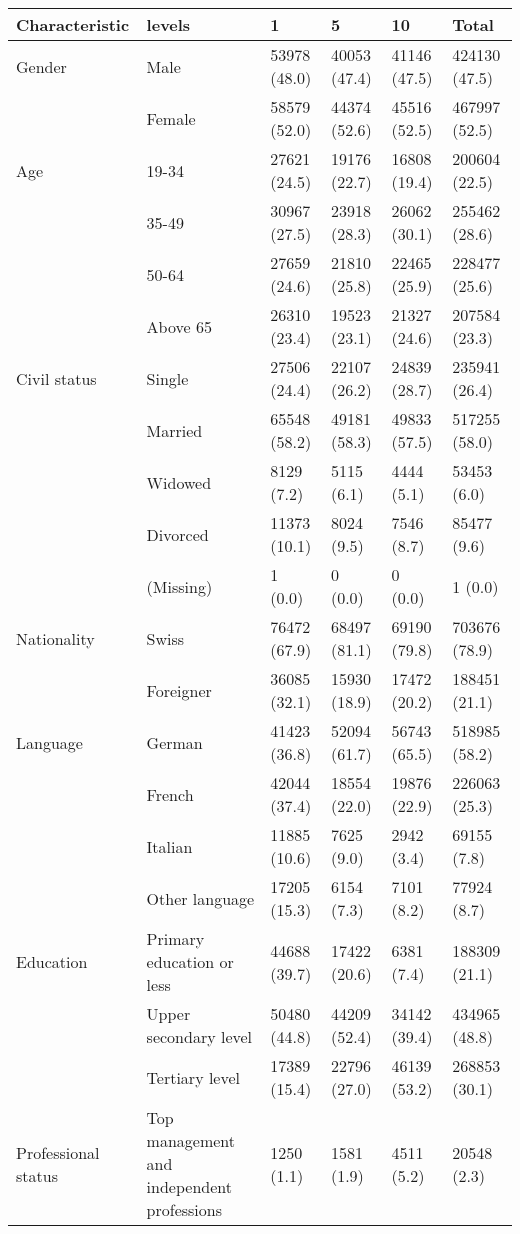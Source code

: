 
\begin{tabular}{llllll}
\toprule
Characteristic & levels & 1 & 5 & 10 & Total\\
\midrule
Gender & Male & 53978 (48.0) & 40053 (47.4) & 41146 (47.5) & 424130 (47.5)\\
 & Female & 58579 (52.0) & 44374 (52.6) & 45516 (52.5) & 467997 (52.5)\\
\addlinespace
Age & 19-34 & 27621 (24.5) & 19176 (22.7) & 16808 (19.4) & 200604 (22.5)\\
 & 35-49 & 30967 (27.5) & 23918 (28.3) & 26062 (30.1) & 255462 (28.6)\\
 & 50-64 & 27659 (24.6) & 21810 (25.8) & 22465 (25.9) & 228477 (25.6)\\
 & Above 65 & 26310 (23.4) & 19523 (23.1) & 21327 (24.6) & 207584 (23.3)\\
\addlinespace
Civil status & Single & 27506 (24.4) & 22107 (26.2) & 24839 (28.7) & 235941 (26.4)\\
 & Married & 65548 (58.2) & 49181 (58.3) & 49833 (57.5) & 517255 (58.0)\\
 & Widowed & 8129 (7.2) & 5115 (6.1) & 4444 (5.1) & 53453 (6.0)\\
 & Divorced & 11373 (10.1) & 8024 (9.5) & 7546 (8.7) & 85477 (9.6)\\
 & (Missing) & 1 (0.0) & 0 (0.0) & 0 (0.0) & 1 (0.0)\\
\addlinespace
Nationality & Swiss & 76472 (67.9) & 68497 (81.1) & 69190 (79.8) & 703676 (78.9)\\
 & Foreigner & 36085 (32.1) & 15930 (18.9) & 17472 (20.2) & 188451 (21.1)\\
Language & German & 41423 (36.8) & 52094 (61.7) & 56743 (65.5) & 518985 (58.2)\\
 & French & 42044 (37.4) & 18554 (22.0) & 19876 (22.9) & 226063 (25.3)\\
 & Italian & 11885 (10.6) & 7625 (9.0) & 2942 (3.4) & 69155 (7.8)\\
 & Other language & 17205 (15.3) & 6154 (7.3) & 7101 (8.2) & 77924 (8.7)\\
\addlinespace
Education & Primary education or less & 44688 (39.7) & 17422 (20.6) & 6381 (7.4) & 188309 (21.1)\\
 & Upper secondary level & 50480 (44.8) & 44209 (52.4) & 34142 (39.4) & 434965 (48.8)\\
 & Tertiary level & 17389 (15.4) & 22796 (27.0) & 46139 (53.2) & 268853 (30.1)\\
\addlinespace
Professional status & Top management and independent professions & 1250 (1.1) & 1581 (1.9) & 4511 (5.2) & 20548 (2.3)\\

\end{tabular}
